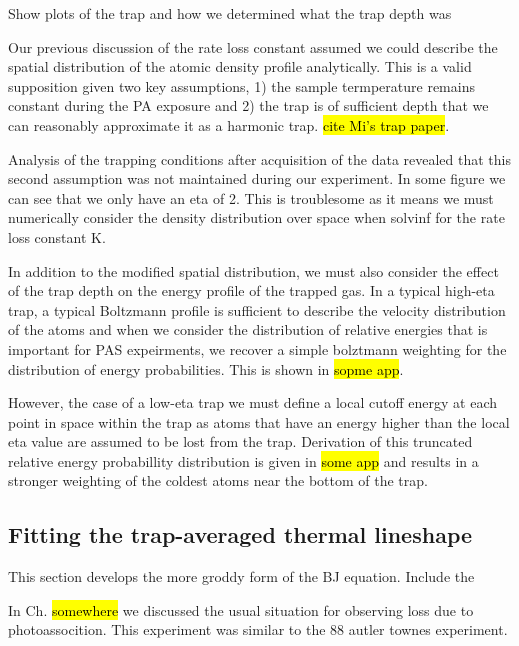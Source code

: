 Show plots of the trap and how we determined what the trap depth was

Our previous discussion of the rate loss constant assumed we could describe the spatial distribution of the atomic density profile analytically. This is a valid supposition given two key assumptions, 1) the sample termperature remains constant during the PA exposure and 2) the trap is of sufficient depth that we can reasonably approximate it as a harmonic trap. \hl{cite Mi's trap paper}.

Analysis of the trapping conditions after acquisition of the data revealed that this second assumption was not maintained during our experiment. In some figure we can see that we only have an eta of 2. This is troublesome as it means we must numerically consider the density distribution over space when solvinf for the rate loss constant K. 

In addition to the modified spatial distribution, we must also consider the effect of the trap depth on the energy profile of the trapped gas. In a typical high-eta trap, a typical Boltzmann profile is sufficient to describe the velocity distribution of the atoms and when we consider the distribution of relative energies that is important for PAS expeirments, we recover a simple bolztmann weighting for the distribution of energy probabilities. This is shown in \hl{sopme app}.

However, the case of a low-eta trap we must define a local cutoff energy at each point in space within the trap as atoms that have an energy higher than the local eta value are assumed to be lost from the trap. Derivation of this truncated relative energy probabillity distribution is given in \hl{some app} and results in a stronger weighting of the coldest atoms near the bottom of the trap.

\subsection{Fitting the trap-averaged thermal lineshape}

This section develops the more groddy form of the BJ equation. Include the 

In Ch. \hl{somewhere} we discussed the usual situation for observing loss due to photoassocition. This experiment was similar to the 88 autler townes experiment. 

